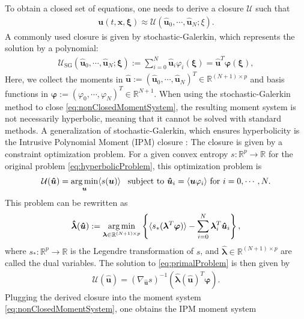 To obtain a closed set of equations, one needs to derive a closure $\mathcal{U}$ such that 
\begin{align*}
\bm{u}(t,\bm x,\bm \xi) \approx \mathcal{U}(\bm{\hat u}_0,\cdots,\bm{\hat u}_N;\xi).
\end{align*}
A commonly used closure is given by stochastic-Galerkin, which represents the solution by a polynomial:
\begin{align*}
\mathcal{U}_{\text{SG}}(\bm{\hat u}_0,\cdots,\bm{\hat u}_N;\bm\xi):= \sum_{i=0}^N \bm{\hat{u}}_i\varphi_i(\bm{\xi}) = \hat{\bm u}^T\bm{\varphi}(\bm\xi),
\end{align*}
Here, we collect the moments in $\bm{\hat{u}}:=(\bm{\hat{u}}_0,\cdots,\bm{\hat{u}}_N)^T\in\mathbb{R}^{(N+1) \times p}$ and basis functions in $\bm{\varphi}:=(\varphi_0,\cdots,\varphi_N)^T\in\mathbb{R}^{N+1}$. When using the stochastic-Galerkin method to close \eqref{eq:nonClosedMomentSystem}, the resulting moment system is not necessarily hyperbolic, meaning that it cannot be solved with standard methods. A generalization of stochastic-Galerkin, which ensures hyperbolicity is the Intrusive Polynomial Moment (IPM) closure \cite{poette2009uncertainty}: The closure is given by a constraint optimization problem. For a given convex entropy $s:\mathbb{R}^p\to\mathbb{R}$ for the original problem \eqref{eq:hyperbolicProblem}, this optimization problem is
\begin{align}\label{eq:primalProblem}
\mathcal{U}(\bm{\hat u}) = \operatorname*{arg\,min}_{\bm u} \langle s(\bm u) \rangle \enskip \text{ subject to } \bm{\hat u}_i = \langle \bm u \varphi_i \rangle \text{ for } i = 0,\cdots,N.
\end{align}
This problem can be rewritten as
\begin{align}\label{eq:dualProblem}
 \bm{\hat \lambda}(\bm{\hat u}) := \operatorname*{arg\,min}_{\bm{\lambda} \in \mathbb{R}^{(N+1) \times p}}
  \left\{\langle s_*(\bm{\lambda}^T \bm\varphi)\rangle - \sum_{i=0}^{N}\bm{\lambda}_i^T \bm{\hat u}_i\right\},
\end{align}
where $s_*:\mathbb{R}^p\to\mathbb{R}$ is the Legendre transformation of $s$, and $\bm{ \hat\lambda}\in \mathbb{R}^{(N+1) \times p}$ are called the dual variables. The solution to \eqref{eq:primalProblem} is then given by
\begin{align}\label{eq:ansatz}
 \mathcal{U}(\bm{\hat u}) = \left( \nabla_{\bm{\hat u}} s \right)^{-1}(\bm{\hat{\lambda}}(\bm{\hat u})^T \bm{\varphi}).
\end{align}
Plugging the derived closure into the moment system \eqref{eq:nonClosedMomentSystem}, one obtains the IPM moment system

